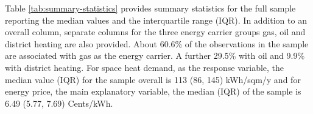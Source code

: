\documentclass[12pt,twoside]{reedthesis}
\begin{document}
Table \ref{tab:summary-statistics} provides summary statistics for the full sample reporting the median values and the interquartile range (IQR). In addition to an overall column, separate columns for the three energy carrier groups gas, oil and district heating are also provided. About 60.6\% of the observations in the sample are associated with gas as the energy carrier. A further 29.5\% with oil and 9.9\% with district heating. For space heat demand, as the response variable, the median value (IQR) for the sample overall is 113 (86, 145) kWh/sqm/y and for energy price, the main explanatory variable, the median (IQR) of the sample is 6.49 (5.77, 7.69) Cents/kWh.
\begin{table}[]
\centering
\caption{Summary statistics for full sample}
\label{tab:summary-statistics}
\end{table}
\end{document}
